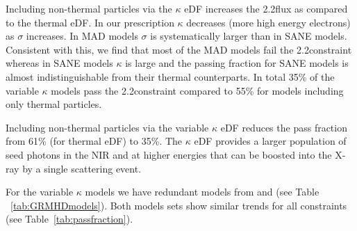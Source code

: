 Including non-thermal particles via the $\kappa$ eDF increases the 2.2\um flux as compared to the thermal eDF.  In our prescription $\kappa$ decreases (more high energy electrons) as $\sigma$ increases.  In MAD models $\sigma$ is systematically larger than in SANE models.  Consistent with this, we find that most of the MAD models fail the 2.2\um constraint whereas in SANE models $\kappa$ is large and the passing fraction for SANE models is almost indistinguishable from their thermal counterparts.
In total 35\% of the variable $\kappa$ models pass the 2.2\um constraint compared to 55\% for models including only thermal particles.


Including non-thermal particles via the variable $\kappa$ eDF reduces the pass fraction from 61\% (for thermal eDF) to 35\%.  The $\kappa$ eDF provides a larger population of seed photons in the NIR and at higher energies that can be boosted into the X-ray by a single scattering event.


For the variable $\kappa$ models we have redundant models from \bhac and \hamr (see Table ~\ref{tab:GRMHDmodels}).
Both models sets show similar trends for all constraints (see Table~\ref{tab:passfraction}).

